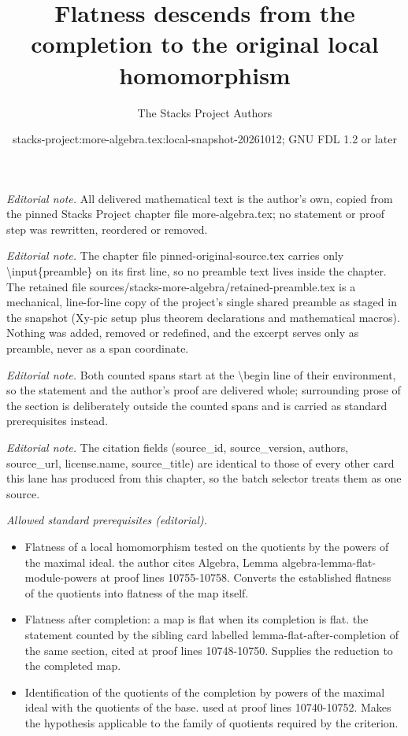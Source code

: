 \documentclass[10pt,a4paper]{amsart}
\title{Flatness descends from the completion to the original local homomorphism}
\author{The Stacks Project Authors}
\date{stacks-project:more-algebra.tex:local-snapshot-20261012; GNU FDL 1.2 or later}
\theoremstyle{plain}
\theoremstyle{definition}
\theoremstyle{remark}
\numberwithin{equation}{subsection}
\begin{document}
\maketitle
\setcounter{subsection}{1}
\noindent\textit{Editorial note.} All delivered mathematical text is the author's own, copied from the pinned Stacks Project chapter file more-algebra.tex; no statement or proof step was rewritten, reordered or removed.\par\medskip
\noindent\textit{Editorial note.} The chapter file pinned-original-source.tex carries only \textbackslash{}input\{preamble\} on its first line, so no preamble text lives inside the chapter. The retained file sources/stacks-more-algebra/retained-preamble.tex is a mechanical, line-for-line copy of the project's single shared preamble as staged in the snapshot (Xy-pic setup plus theorem declarations and mathematical macros). Nothing was added, removed or redefined, and the excerpt serves only as preamble, never as a span coordinate.\par\medskip
\noindent\textit{Editorial note.} Both counted spans start at the \textbackslash{}begin line of their environment, so the statement and the author's proof are delivered whole; surrounding prose of the section is deliberately outside the counted spans and is carried as standard prerequisites instead.\par\medskip
\noindent\textit{Editorial note.} The citation fields (source\_id, source\_version, authors, source\_url, license.name, source\_title) are identical to those of every other card this lane has produced from this chapter, so the batch selector treats them as one source.\par\medskip
\noindent\textit{Allowed standard prerequisites (editorial).}\begin{itemize}
\item Flatness of a local homomorphism tested on the quotients by the powers of the maximal ideal. the author cites Algebra, Lemma algebra-lemma-flat-module-powers at proof lines 10755-10758. Converts the established flatness of the quotients into flatness of the map itself.
\item Flatness after completion: a map is flat when its completion is flat. the statement counted by the sibling card labelled lemma-flat-after-completion of the same section, cited at proof lines 10748-10750. Supplies the reduction to the completed map.
\item Identification of the quotients of the completion by powers of the maximal ideal with the quotients of the base. used at proof lines 10740-10752. Makes the hypothesis applicable to the family of quotients required by the criterion.
\end{itemize}\medskip
\end{document}
